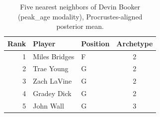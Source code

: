 \begin{table}[htbp]
  \centering\small
  \begin{tabular}{rllc}
    \toprule
    Rank & Player & Position & Archetype \\
    \midrule
    1 & Miles Bridges & F & 2 \\
    2 & Trae Young & G & 2 \\
    3 & Zach LaVine & G & 2 \\
    4 & Gradey Dick & G & 2 \\
    5 & John Wall & G & 3 \\
    \bottomrule
  \end{tabular}
  \caption{Five nearest neighbors of Devin Booker (peak_age modality), Procrustes-aligned posterior mean.}
  \label{tab:Devin_Booker_neighbors_peak_age}
\end{table}

